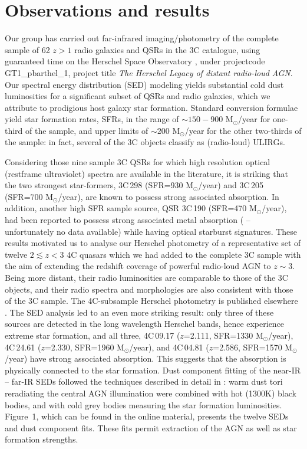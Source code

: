 \documentclass[preprint]{aastex}
\begin{document}
\section{Observations and results}

Our group \citep{podi15, podi16a} has carried out far-infrared
imaging/photometry of the complete sample of 62 $z>1$ radio galaxies and
QSRs in the 3C catalogue, using guaranteed time on the Herschel Space
Observatory \citep{pilbratt10}, under projectcode GT1\_pbarthel\_1,
project title {\it The Herschel Legacy of distant radio-loud AGN}.  Our
spectral energy distribution (SED) modeling yields substantial cold
dust luminosities for a significant subset of QSRs and radio galaxies,
which we attribute to prodigious host galaxy star formation.  Standard
conversion formulae \citep{kennicutt98} yield star formation rates,
SFRs, in the range of $\sim 150 - 900$ M$_{\odot}$/year for one-third of
the sample, and upper limits of $\sim 200$ M$_{\odot}$/year for the
other two-thirds of the sample: in fact, several of the 3C objects
classify as (radio-loud) ULIRGs. 

Considering those nine sample 3C QSRs for which high resolution optical
(restframe ultraviolet) spectra are available in the literature, it is
striking that the two strongest star-formers, 3C\,298 (SFR=930
M$_{\odot}$/year) and 3C\,205 (SFR=700 M$_{\odot}$/year), are known
\citep{anderson87} to possess strong associated  absorption. 
In addition, another high SFR sample source, QSR 3C\,190 (SFR=470
M$_{\odot}$/year), had been reported \citep{stockton01} to possess
strong associated metal absorption ( -- unfortunately no
 data available) while having optical starburst signatures. 
These results motivated us to analyse our Herschel photometry of a
representative set of twelve $2 \lesssim z < 3$ 4C quasars which we had
added to the complete 3C sample with the aim of extending the redshift
coverage of powerful radio-loud AGN to $z \sim 3$.  Being more distant,
their radio luminosities are comparable to those of the 3C objects, and
their radio spectra and morphologies are also consistent with those of
the 3C sample.  The 4C-subsample Herschel photometry is published
elsewhere \citep{podi16b}.  The SED analysis led to an even more
striking result: only three of these sources are detected in the long
wavelength Herschel bands, hence experience extreme star formation, and
all three, 4C\,09.17 ($z$=2.111, SFR=1330 M$_{\odot}$/year), 4C\,24.61
($z$=2.330, SFR=1960 M$_{\odot}$/year), and 4C\,04.81 ($z$=2.586,
SFR=1570 M$_{\odot}$/year) have \citep{pdb90} strong associated
 absorption.  This suggests that the absorption is physically
connected to the star formation.  Dust component fitting of the near-IR
-- far-IR SEDs followed the techniques described in detail in
\citet{podi15}: \citet{hoenig10} warm dust tori reradiating the central
AGN illumination were combined with hot (1300K) black bodies, and with
cold grey bodies measuring the star formation luminosities.  Figure~1,
which can be found in the online material, presents the twelve SEDs and
dust component fits.  These fits permit extraction of the AGN as well as
star formation strengths. 
\end{document}
